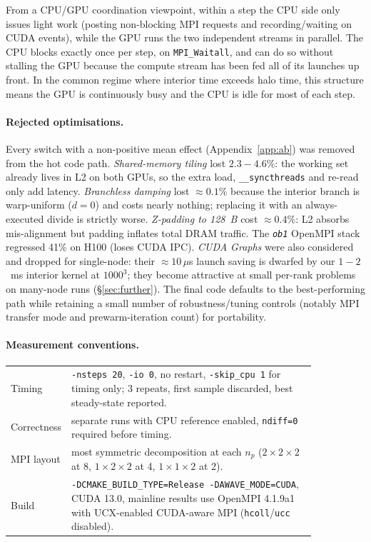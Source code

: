 \documentclass[10pt,a4paper]{article}
\begin{document}
From a CPU/GPU coordination viewpoint, within a step the CPU side only issues light work (posting non-blocking MPI requests and recording/waiting on CUDA events), while the GPU runs the two independent streams in parallel. The CPU blocks exactly once per step, on \texttt{MPI\_Waitall}, and can do so without stalling the GPU because the compute stream has been fed all of its launches up front. In the common regime where interior time exceeds halo time, this structure means the GPU is continuously busy and the CPU is idle for most of each step.

\paragraph{Rejected optimisations.}
Every switch with a non-positive mean effect (Appendix~\ref{app:ab}) was removed from the hot code path. \emph{Shared-memory tiling} lost $2.3\!-\!4.6\%$: the working set already lives in L2 on both GPUs, so the extra load, \texttt{\_\_syncthreads} and re-read only add latency. \emph{Branchless damping} lost $\approx 0.1\%$ because the interior branch is warp-uniform ($d{=}0$) and costs nearly nothing; replacing it with an always-executed divide is strictly worse. \emph{Z-padding to 128~B} cost $\approx 0.4\%$: L2 absorbs mis-alignment but padding inflates total DRAM traffic. The \emph{\texttt{ob1}} OpenMPI stack regressed 41\% on H100 (loses CUDA IPC). \emph{CUDA Graphs} were also considered and dropped for single-node: their $\approx 10\,\mu$s launch saving is dwarfed by our $1\!-\!2$~ms interior kernel at $1000^3$; they become attractive at small per-rank problems on many-node runs (\S\ref{sec:further}). The final code defaults to the best-performing path while retaining a small number of robustness/tuning controls (notably MPI transfer mode and prewarm-iteration count) for portability.

\paragraph{Measurement conventions.}\mbox{}\par\nobreak\vspace{1pt}
\begin{center}\small
\begin{tabular}{@{}l p{0.85\linewidth}@{}}
\toprule
Timing       & \texttt{-nsteps 20}, \texttt{-io 0}, no restart, \texttt{-skip\_cpu 1} for timing only; 3 repeats, first sample discarded, best steady-state reported. \\
Correctness  & separate runs with CPU reference enabled, \texttt{ndiff=0} required before timing. \\
MPI layout   & most symmetric decomposition at each $n_p$ ($2{\times}2{\times}2$ at 8, $1{\times}2{\times}2$ at 4, $1{\times}1{\times}2$ at 2). \\
Build        & \texttt{-DCMAKE\_BUILD\_TYPE=Release -DAWAVE\_MODE=CUDA}, CUDA 13.0, mainline results use OpenMPI 4.1.9a1 with UCX-enabled CUDA-aware MPI (\texttt{hcoll}/\texttt{ucc} disabled). \\
\bottomrule
\end{tabular}
\end{center}
\end{document}
